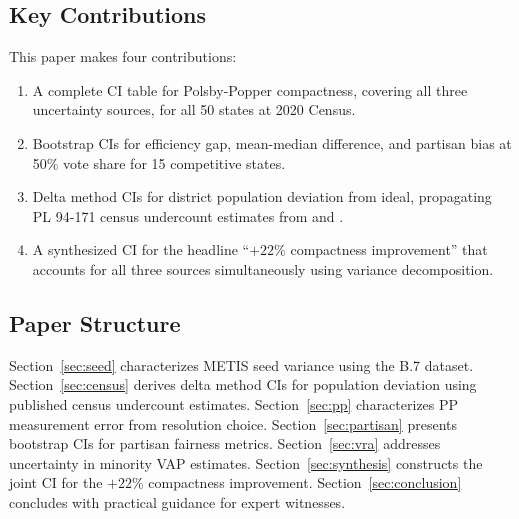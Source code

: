 \subsection{Key Contributions}

This paper makes four contributions:

\begin{enumerate}
  \item A complete CI table for Polsby-Popper compactness, covering
    all three uncertainty sources, for all 50 states at 2020 Census.

  \item Bootstrap CIs for efficiency gap, mean-median difference, and
    partisan bias at 50\% vote share for 15 competitive states.

  \item Delta method CIs for district population deviation from ideal,
    propagating PL 94-171 census undercount estimates from
    \citet{brown2018demographic} and \citet{daponte2021census}.

  \item A synthesized CI for the headline ``$+22\%$ compactness
    improvement'' that accounts for all three sources simultaneously
    using variance decomposition.
\end{enumerate}

\subsection{Paper Structure}

Section~\ref{sec:seed} characterizes METIS seed variance using the
B.7 dataset. Section~\ref{sec:census} derives delta method CIs for
population deviation using published census undercount estimates.
Section~\ref{sec:pp} characterizes PP measurement error from resolution
choice. Section~\ref{sec:partisan} presents bootstrap CIs for partisan
fairness metrics. Section~\ref{sec:vra} addresses uncertainty in
minority VAP estimates. Section~\ref{sec:synthesis} constructs the
joint CI for the $+22\%$ compactness improvement. Section~\ref{sec:conclusion}
concludes with practical guidance for expert witnesses.
